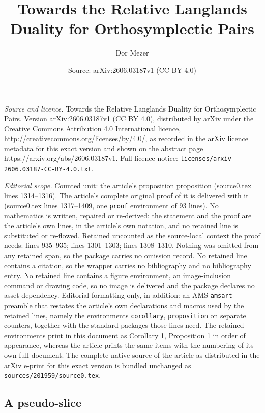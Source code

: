 \documentclass[10pt,a4paper]{amsart}
\title{Towards the Relative Langlands Duality for Orthosymplectic Pairs}
\author{Dor Mezer}
\date{Source: arXiv:2606.03187v1 (CC BY 4.0)}
\begin{document}
\maketitle

\noindent\emph{Source and licence.} Towards the Relative Langlands Duality for Orthosymplectic Pairs. Version arXiv:2606.03187v1 (CC BY 4.0), distributed by arXiv under the Creative Commons Attribution 4.0 International licence, http://creativecommons.org/licenses/by/4.0/, as recorded in the arXiv licence metadata for this exact version and shown on the abstract page https://arxiv.org/abs/2606.03187v1. Full licence notice: \texttt{licenses/arxiv-2606.03187-CC-BY-4.0.txt}.\par\smallskip

\noindent\textit{Editorial scope.} Counted unit: the article's proposition proposition (source0.tex lines 1314--1316). The article's complete original proof of it is delivered with it (source0.tex lines 1317--1409, one \texttt{proof} environment of 93 lines). No mathematics is written, repaired or re-derived: the statement and the proof are the article's own lines, in the article's own notation, and no retained line is substituted or re-flowed.  Retained uncounted as the source-local context the proof needs: lines 935--935; lines 1301--1303; lines 1308--1310.  Nothing was omitted from any retained span, so the package carries no omission record.  No retained line contains a citation, so the wrapper carries no bibliography and no bibliography entry.  No retained line contains a figure environment, an image-inclusion command or drawing code, so no image is delivered and the package declares no asset dependency.  Editorial formatting only, in addition: an AMS \texttt{amsart} preamble that restates the article's own declarations and macros used by the retained lines, namely the environments \texttt{corollary}, \texttt{proposition} on separate counters, together with the standard packages those lines need.  The retained environments print in this document as Corollary 1, Proposition 1 in order of appearance, whereas the article prints the same items with the numbering of its own full document.  The complete native source of the article as distributed in the arXiv e-print for this exact version is bundled unchanged as \texttt{sources/201959/source0.tex}.
\subsection{A pseudo-slice}\label{sec: pseudo-slice}
\end{document}
